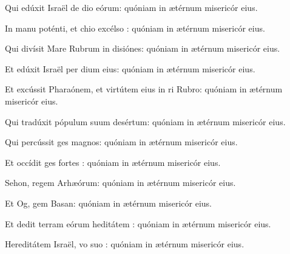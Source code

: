 \item {}

\item Qui edúxit Israël de dio eórum:\psstar{} quóniam in ætérnum misericór eius.

\item In manu poténti, et chio excélso :\psstar{} quóniam in ætérnum misericór eius.

\item Qui divísit Mare Rubrum in disiónes:\psstar{} quóniam in ætérnum misericór eius.

\item Et edúxit Israël per dium eius:\psstar{} quóniam in ætérnum misericór eius.

\item Et excússit Pharaónem, et virtútem eius in ri Rubro:\psstar{} quóniam in ætérnum misericór eius.

\item Qui tradúxit pópulum suum  desértum:\psstar{} quóniam in ætérnum misericór eius.

\item Qui percússit ges magnos:\psstar{} quóniam in ætérnum misericór eius.

\item Et occídit ges fortes :\psstar{} quóniam in ætérnum misericór eius.

\item Sehon, regem Arhæórum:\psstar{} quóniam in ætérnum misericór eius.

\item Et Og, gem Basan:\psstar{} quóniam in ætérnum misericór eius.

\item Et dedit terram eórum heditátem :\psstar{} quóniam in ætérnum misericór eius.

\item Hereditátem Israël, vo suo :\psstar{} quóniam in ætérnum misericór eius.

